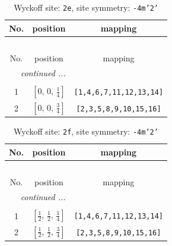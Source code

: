 \documentclass[fleqn,8pt]{jsarticle}
\begin{document}
\begin{longtable}{ccc}
\caption{Wyckoff site: {\tt 2e}, site symmetry: {\tt -4m'2'}}
 \\
 \hline \hline
No. & position & mapping \\ \hline \endfirsthead

\multicolumn{2}{l}{\tablename\ \thetable{}} \\
 \hline \hline
No. & position & mapping \\ \hline \endhead

 \hline \hline
\multicolumn{2}{r}{\footnotesize\it continued ...} \\ \endfoot

 \hline \hline
\multicolumn{2}{r}{} \\ \endlastfoot

1 & $\left[ 0,\, 0,\, \frac{1}{4} \right]$ & {\tt [1,4,6,7,11,12,13,14]} \\ \hline
2 & $\left[ 0,\, 0,\, \frac{3}{4} \right]$ & {\tt [2,3,5,8,9,10,15,16]} \\
\end{longtable}
\renewcommand{\arraystretch}{1.2}
\begin{longtable}{ccc}
\caption{Wyckoff site: {\tt 2f}, site symmetry: {\tt -4m'2'}}
 \\
 \hline \hline
No. & position & mapping \\ \hline \endfirsthead

\multicolumn{2}{l}{\tablename\ \thetable{}} \\
 \hline \hline
No. & position & mapping \\ \hline \endhead

 \hline \hline
\multicolumn{2}{r}{\footnotesize\it continued ...} \\ \endfoot

 \hline \hline
\multicolumn{2}{r}{} \\ \endlastfoot

1 & $\left[ \frac{1}{2},\, \frac{1}{2},\, \frac{1}{4} \right]$ & {\tt [1,4,6,7,11,12,13,14]} \\ \hline
2 & $\left[ \frac{1}{2},\, \frac{1}{2},\, \frac{3}{4} \right]$ & {\tt [2,3,5,8,9,10,15,16]} \\
\end{longtable}
\renewcommand{\arraystretch}{1.2}
\end{document}
